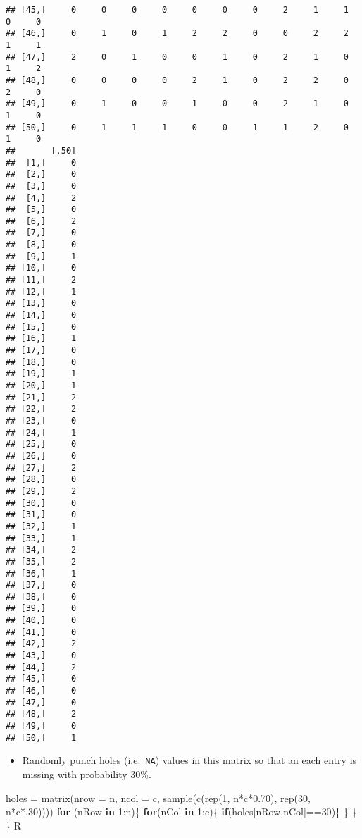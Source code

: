 \documentclass[
]{article}
\newenvironment{Shaded}{\begin{snugshade}}{\end{snugshade}}
\newcommand{\AttributeTok}[1]{\textcolor[rgb]{0.77,0.63,0.00}{#1}}
\newcommand{\ControlFlowTok}[1]{\textcolor[rgb]{0.13,0.29,0.53}{\textbf{#1}}}
\newcommand{\DecValTok}[1]{\textcolor[rgb]{0.00,0.00,0.81}{#1}}
\newcommand{\FloatTok}[1]{\textcolor[rgb]{0.00,0.00,0.81}{#1}}
\newcommand{\FunctionTok}[1]{\textcolor[rgb]{0.00,0.00,0.00}{#1}}
\newcommand{\NormalTok}[1]{#1}
\newcommand{\OtherTok}[1]{\textcolor[rgb]{0.56,0.35,0.01}{#1}}
\newcommand{\SpecialCharTok}[1]{\textcolor[rgb]{0.00,0.00,0.00}{#1}}
\providecommand{\tightlist}{%
  \setlength{\itemsep}{0pt}\setlength{\parskip}{0pt}}
\begin{document}
\begin{verbatim}
## [45,]     0     0     0     0     0     0     0     2     1     1     0     0
## [46,]     0     1     0     1     2     2     0     0     2     2     1     1
## [47,]     2     0     1     0     0     1     0     2     1     0     1     2
## [48,]     0     0     0     0     2     1     0     2     2     0     2     0
## [49,]     0     1     0     0     1     0     0     2     1     0     1     0
## [50,]     0     1     1     1     0     0     1     1     2     0     1     0
##       [,50]
##  [1,]     0
##  [2,]     0
##  [3,]     0
##  [4,]     2
##  [5,]     0
##  [6,]     2
##  [7,]     0
##  [8,]     0
##  [9,]     1
## [10,]     0
## [11,]     2
## [12,]     1
## [13,]     0
## [14,]     0
## [15,]     0
## [16,]     1
## [17,]     0
## [18,]     0
## [19,]     1
## [20,]     1
## [21,]     2
## [22,]     2
## [23,]     0
## [24,]     1
## [25,]     0
## [26,]     0
## [27,]     2
## [28,]     0
## [29,]     2
## [30,]     0
## [31,]     0
## [32,]     1
## [33,]     1
## [34,]     2
## [35,]     2
## [36,]     1
## [37,]     0
## [38,]     0
## [39,]     0
## [40,]     0
## [41,]     0
## [42,]     2
## [43,]     0
## [44,]     2
## [45,]     0
## [46,]     0
## [47,]     0
## [48,]     2
## [49,]     0
## [50,]     1
\end{verbatim}

\begin{itemize}
\tightlist
\item
  Randomly punch holes (i.e.~\texttt{NA}) values in this matrix so that
  an each entry is missing with probability 30\%.
\end{itemize}

\begin{Shaded}
\begin{Highlighting}[]
\NormalTok{holes }\OtherTok{=} \FunctionTok{matrix}\NormalTok{(}\AttributeTok{nrow =}\NormalTok{ n, }\AttributeTok{ncol =}\NormalTok{ c, }\FunctionTok{sample}\NormalTok{(}\FunctionTok{c}\NormalTok{(}\FunctionTok{rep}\NormalTok{(}\DecValTok{1}\NormalTok{, n}\SpecialCharTok{*}\NormalTok{c}\SpecialCharTok{*}\FloatTok{0.70}\NormalTok{), }\FunctionTok{rep}\NormalTok{(}\DecValTok{30}\NormalTok{, n}\SpecialCharTok{*}\NormalTok{c}\SpecialCharTok{*}\NormalTok{.}\DecValTok{30}\NormalTok{))))}
\ControlFlowTok{for}\NormalTok{ (nRow }\ControlFlowTok{in} \DecValTok{1}\SpecialCharTok{:}\NormalTok{n)\{}
  \ControlFlowTok{for}\NormalTok{(nCol }\ControlFlowTok{in} \DecValTok{1}\SpecialCharTok{:}\NormalTok{c)\{}
    \ControlFlowTok{if}\NormalTok{(holes[nRow,nCol]}\SpecialCharTok{==}\DecValTok{30}\NormalTok{)\{}
\NormalTok{    \}}
\NormalTok{  \}}
\NormalTok{\}}
\NormalTok{R}
\end{Highlighting}
\end{Shaded}
\end{document}
